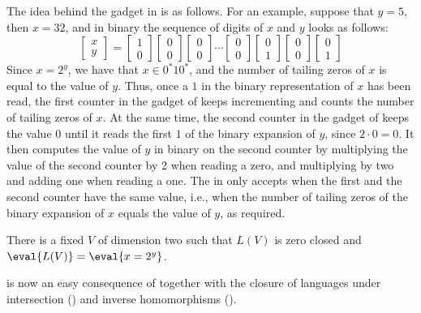 %
The idea behind the gadget in  is as
follows. For an example, suppose that $y=5$, then $x=32$, and in
binary the sequence of digits of $x$ and $y$ looks as follows:
%
\[
\left[
\begin{smallmatrix}
  x \\ y
\end{smallmatrix}
\right] = \left[
\begin{smallmatrix}
  1 \\ 0
\end{smallmatrix}
\right]
\left[
\begin{smallmatrix}
  0 \\ 0
\end{smallmatrix}
\right]
\left[
\begin{smallmatrix}
  0 \\ 0
\end{smallmatrix}
\right]
  \cdots
\left[
\begin{smallmatrix}
  0 \\ 0
\end{smallmatrix}
\right]
\left[
\begin{smallmatrix}
  0 \\ 1
\end{smallmatrix}
\right]
\left[
\begin{smallmatrix}
  0 \\ 0
\end{smallmatrix}
\right]
\left[
\begin{smallmatrix}
  0 \\ 1
\end{smallmatrix}
\right]
\]
%
Since $x=2^y$, we have that $x\in 0^*10^*$, and the number of tailing
zeros of $x$ is equal to the value of $y$. Thus, once a $1$ in the
binary representation of $x$ has been read, the first counter in the
gadget of  keeps incrementing and counts
the number of tailing zeros of $x$. At the same time, the second
counter in the gadget of  keeps the value
0 until it reads the first $1$ of the binary expansion of $y$, since
$2\cdot 0=0$. It then computes the value of $y$ in binary on the
second counter by multiplying the value of the second counter by 2
when reading a zero, and multiplying by two and adding one when
reading a one. The \laVASS in  only
accepts when the first and the second counter have the same value,
i.e., when the number of tailing zeros of the binary expansion of $x$
equals the value of $y$, as required.
%
\begin{lemma}\label{lem:exponential-lavass}
  There is a fixed \laVASS $V$ of dimension two such that $L(V)$ is
  zero closed and $\eval{L(V)}=\eval{x = 2^y}$.
\end{lemma}
%

 is now an easy consequence of
 together with the
closure of \laVASS languages under intersection
() and inverse homomorphisms
().
